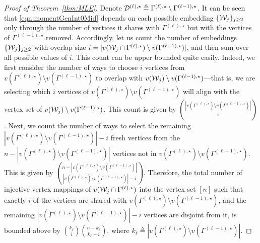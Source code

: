 \documentclass[12pt]{article}
\newcommand{\calD}{{\cal D}}
\newcommand{\calW}{{\cal W}}
\begin{document}
\begin{proof}[Proof of Theorem~\ref{thm:MLE}]
Denote $\calD^{(\ell),\star} \triangleq \Gamma^{(\ell),\star} \setminus \Gamma^{(\ell-1),\star}$. It can be seen that \eqref{eqn:momentGenInt0Mid} depends on each possible embedding $\{\calW_j\}_{j\geq 2}$ only through the number of vertices it shares with $\Gamma^{(\ell),\star}$ but with the vertices of $\Gamma^{(\ell-1),\star}$ removed. Accordingly, let us count the number of embeddings $\{\calW_j\}_{j\geq 2}$ with overlap size $i = |v(\calW_j\cap\Gamma^{(\ell),\star})\setminus v(\Gamma^{(\ell-1),\star})|$, and then sum over all possible values of $i$. This count can be upper bounded quite easily. Indeed, we first consider the number of ways to choose $i$ vertices from $v(\Gamma^{(\ell),\star}) \setminus v(\Gamma^{(\ell-1),\star})$ to overlap with $v(\calW_j) \setminus v(\Gamma^{(\ell-1),\star})$—that is, we are selecting which $i$ vertices of $v(\Gamma^{(\ell),\star})\setminus v(\Gamma^{(\ell-1),\star})$ will align with the vertex set of $v(\calW_j) \setminus v(\Gamma^{(\ell-1),\star})$. This count is given by $\binom{|v(\Gamma^{(\ell),\star}) \setminus v(\Gamma^{(\ell-1),\star})|}{i}$. Next, we count the number of ways to select the remaining $|v(\Gamma^{(\ell),\star}) \setminus v(\Gamma^{(\ell-1),\star})|-i$ fresh vertices from the $n - |v(\Gamma^{(\ell),\star}) \setminus v(\Gamma^{(\ell-1),\star})|$ vertices not in $v(\Gamma^{(\ell),\star})\setminus v(\Gamma^{(\ell-1),\star})$. This is given by $\binom{n-|v(\Gamma^{(\ell),\star}) \setminus v(\Gamma^{(\ell-1),\star})|}{|v(\Gamma^{(\ell),\star}) \setminus v(\Gamma^{(\ell-1),\star})|-i}$. Therefore, the total number of injective vertex mappings of $v(\calW_j\cap\Gamma^{(\ell),\star})$ into the vertex set $[n]$ such that exactly $i$ of the vertices are shared with $v(\Gamma^{(\ell),\star})\setminus v(\Gamma^{(\ell-1),\star})$, and the remaining $|v(\Gamma^{(\ell),\star}) \setminus v(\Gamma^{(\ell-1),\star})|-i$ vertices are disjoint from it, is bounded above by $\binom{k_\ell}{i}\binom{n-k_\ell}{k_\ell-i}$, where $k_\ell\triangleq |v(\Gamma^{(\ell),\star}) \setminus v(\Gamma^{(\ell-1),\star})|$. 


\end{proof}
\end{document}
